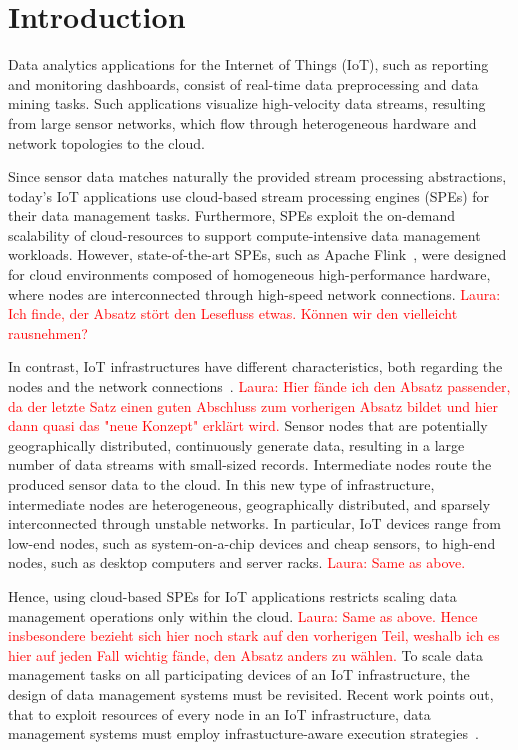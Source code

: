 \section{Introduction}
\label{intro}
% 
Data analytics applications for the Internet of Things (IoT), such as reporting and monitoring dashboards, consist of real-time data preprocessing and data mining tasks.
Such applications visualize high-velocity data streams, resulting from large sensor networks, which flow through heterogeneous hardware and network topologies to the cloud.

Since sensor data matches naturally the provided stream processing abstractions, today's IoT applications use cloud-based stream processing engines (SPEs) for their data management tasks. 
Furthermore, SPEs exploit the on-demand scalability of cloud-resources to support compute-intensive data management workloads.
However, state-of-the-art SPEs, such as Apache Flink~\cite{flink}, were designed for cloud environments composed of homogeneous high-performance hardware, where nodes are interconnected through high-speed network connections. \textcolor{red}{Laura: Ich finde, der Absatz stört den Lesefluss etwas. Können wir den vielleicht rausnehmen?}

In contrast, IoT infrastructures have different characteristics, both regarding the nodes and the network connections~\cite{fog}. \textcolor{red}{Laura: Hier fände ich den Absatz passender, da der letzte Satz einen guten Abschluss zum vorherigen Absatz bildet und hier dann quasi das "neue Konzept" erklärt wird.}
Sensor nodes that are potentially geographically distributed, continuously generate data, resulting in a large number of data streams with small-sized records. Intermediate nodes route the produced sensor data to the cloud.
In this new type of infrastructure, intermediate nodes are heterogeneous, geographically distributed, and sparsely interconnected through unstable networks. 
In particular, IoT devices range from low-end nodes, such as system-on-a-chip devices and cheap sensors, to high-end nodes, such as desktop computers and server racks. \textcolor{red}{Laura: Same as above.}

Hence, using cloud-based SPEs for IoT applications restricts scaling data management operations only within the cloud. \textcolor{red}{Laura: Same as above. Hence insbesondere bezieht sich hier noch stark auf den vorherigen Teil, weshalb ich es hier auf jeden Fall wichtig fände, den Absatz anders zu wählen.} To scale data management tasks on all participating devices of an IoT infrastructure, the design of data management systems must be revisited.
Recent work points out, that to exploit resources of every node in an IoT infrastructure, data management systems must employ infrastucture-aware execution strategies~\cite{nes}.

